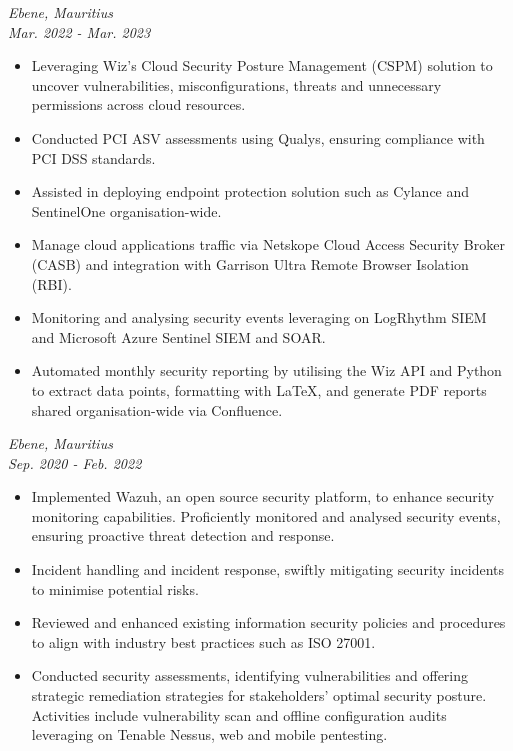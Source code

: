 \documentclass[a4paper, fleqn, oneside]{article}
\begin{document}
{ \hfill \textit{Ebene, Mauritius}} \\
{ \hfill {\textit{Mar. 2022 - Mar. 2023}}}
\begin{itemize}
\item Leveraging Wiz's Cloud Security Posture Management (CSPM) solution to uncover vulnerabilities, misconfigurations, threats and unnecessary permissions across cloud resources.
\item Conducted PCI ASV assessments using Qualys, ensuring compliance with PCI DSS standards.
\item Assisted in deploying endpoint protection solution such as Cylance and SentinelOne organisation-wide.
\item Manage cloud applications traffic via Netskope Cloud Access Security Broker (CASB) and integration with Garrison Ultra Remote Browser Isolation (RBI).
\item Monitoring and analysing security events leveraging on LogRhythm SIEM and Microsoft Azure Sentinel SIEM and SOAR.
\item Automated monthly security reporting by utilising the Wiz API and Python to extract data points, formatting with \LaTeX{}, and generate PDF reports shared organisation-wide via Confluence.
\end{itemize}

\vspace{2em}
{ \hfill \textit{Ebene, Mauritius}} \\
{ \hfill {\textit{Sep. 2020 - Feb. 2022}}}
\begin{itemize}
\item Implemented Wazuh, an open source security platform, to enhance security monitoring capabilities. Proficiently monitored and analysed security events, ensuring proactive threat detection and response.
\item Incident handling and incident response, swiftly mitigating security incidents to minimise potential risks.
\item Reviewed and enhanced existing information security policies and procedures to align with industry best practices such as ISO 27001.
\item Conducted security assessments, identifying vulnerabilities and offering strategic remediation strategies for stakeholders’ optimal security posture. Activities include vulnerability scan and offline configuration audits leveraging on Tenable Nessus, web and mobile pentesting.
\end{itemize}
\end{document}
